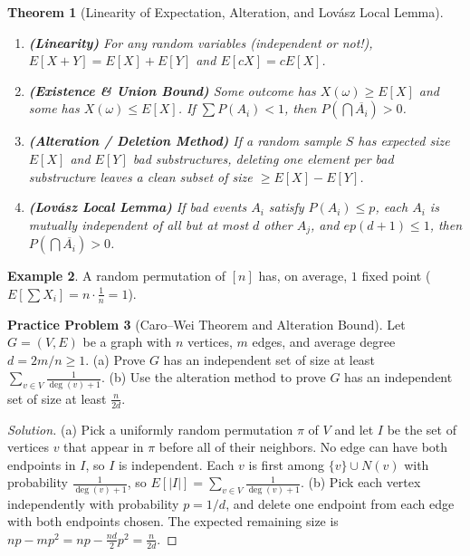 \documentclass[11pt]{article}
\theoremstyle{plain}
\newtheorem{theorem}{Theorem}[section]
\theoremstyle{definition}
\newtheorem{example}[theorem]{Example}
\newtheorem{problem}[theorem]{Practice Problem}
\newenvironment{solution}{\begin{proof}[Solution]}{\end{proof}}
\begin{document}
\begin{theorem}[Linearity of Expectation, Alteration, and Lovász Local Lemma]
\leavevmode
\begin{enumerate}[label=(\alph*)]
\item \textbf{(Linearity)} For any random variables (independent or not!), $E[X + Y] = E[X] + E[Y]$ and $E[cX] = cE[X]$.
\item \textbf{(Existence \& Union Bound)} Some outcome has $X(\omega) \ge E[X]$ and some has $X(\omega) \le E[X]$. If $\sum P(A_i) < 1$, then $P(\bigcap \overline{A_i}) > 0$.
\item \textbf{(Alteration / Deletion Method)} If a random sample $S$ has expected size $E[X]$ and $E[Y]$ bad substructures, deleting one element per bad substructure leaves a clean subset of size $\ge E[X] - E[Y]$.
\item \textbf{(Lovász Local Lemma)} If bad events $A_i$ satisfy $P(A_i) \le p$, each $A_i$ is mutually independent of all but at most $d$ other $A_j$, and $ep(d+1) \le 1$, then $P(\bigcap \overline{A_i}) > 0$.
\end{enumerate}
\end{theorem}

\begin{example}
A random permutation of $[n]$ has, on average, $1$ fixed point ($E[\sum X_i] = n \cdot \frac{1}{n} = 1$).
\end{example}

\begin{problem}[Caro--Wei Theorem and Alteration Bound]
Let $G = (V,E)$ be a graph with $n$ vertices, $m$ edges, and average degree $d = 2m/n \ge 1$.
(a) Prove $G$ has an independent set of size at least $\sum_{v \in V}\frac{1}{\deg(v)+1}$.
(b) Use the alteration method to prove $G$ has an independent set of size at least $\frac{n}{2d}$.
\end{problem}
\begin{solution}
(a) Pick a uniformly random permutation $\pi$ of $V$ and let $I$ be the set of vertices $v$ that appear in $\pi$ before all of their neighbors. No edge can have both endpoints in $I$, so $I$ is independent. Each $v$ is first among $\{v\}\cup N(v)$ with probability $\frac{1}{\deg(v)+1}$, so $E[|I|] = \sum_{v\in V}\frac{1}{\deg(v)+1}$.
(b) Pick each vertex independently with probability $p = 1/d$, and delete one endpoint from each edge with both endpoints chosen. The expected remaining size is $np - mp^2 = np - \frac{nd}{2}p^2 = \frac{n}{2d}$.
\end{solution}
\end{document}
